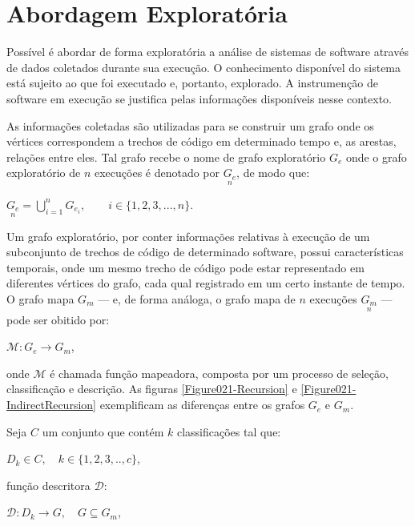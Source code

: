 
\section{Abordagem Exploratória}

\indent Possível é abordar de forma exploratória a análise de sistemas de software
através de dados coletados durante sua execução. O conhecimento disponível do
sistema está sujeito ao que foi executado e, portanto, explorado. A instrumenção
de software em execução se justifica pelas informações disponíveis nesse
contexto.

As informações coletadas são utilizadas para se construir um grafo onde os
vértices correspondem a trechos de código em determinado tempo e, as arestas,
relações entre eles. Tal grafo recebe o nome de grafo exploratório $G_e$ onde o
grafo exploratório de $n$ execuções é denotado por $\underset{n}{G_e}$, de modo
que:

\begin{center}
  $\underset{n}{G_e} = \bigcup\limits_{i=1}^n G_{e_i},
   \qquad i \in \{ 1,2,3,...,n \}.$
\end{center}

Um grafo exploratório, por conter informações relativas à execução de um
subconjunto de trechos de código de determinado software, possui características
temporais, onde um mesmo trecho de código pode estar representado em diferentes
vértices do grafo, cada qual registrado em um certo instante de tempo. O grafo
mapa $G_m$ --- e, de forma análoga, o grafo mapa de $n$ execuções
$\underset{n}{G_m}$ --- pode ser obitido por:

\begin{center}
  $\mathcal{M}:G_e \rightarrow G_m$,
\end{center}

onde $\mathcal{M}$ é chamada função mapeadora, composta por um processo de
seleção, classificação e descrição. As figuras \ref{Figure021-Recursion}
e \ref{Figure021-IndirectRecursion} exemplificam as diferenças entre os
grafos $G_e$ e $G_m$.

Seja $C$ um conjunto que contém $k$ classificações tal que:

\begin{center}
  $D_k \in C, \quad k \in \{ 1, 2, 3, .., c \}$,
\end{center}

função descritora $\mathcal{D}$:

\begin{center}
  $\mathcal{D}:D_k \rightarrow G, \quad G \subseteq {G_m}$,
\end{center}

